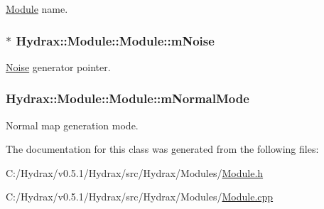 \hyperlink{class_hydrax_1_1_module_1_1_module}{Module} name. 

\hypertarget{class_hydrax_1_1_module_1_1_module_9403c14c89393c8c7f562a1946ca05ab}{
\subsubsection[{mNoise}]{$\ast$ {\bf Hydrax::Module::Module::mNoise}}}
\label{class_hydrax_1_1_module_1_1_module_9403c14c89393c8c7f562a1946ca05ab}


\hyperlink{namespace_hydrax_1_1_noise}{Noise} generator pointer. 

\hypertarget{class_hydrax_1_1_module_1_1_module_962d19d1a608a3935440a08544919f13}{
\subsubsection[{mNormalMode}]{ {\bf Hydrax::Module::Module::mNormalMode}}}
\label{class_hydrax_1_1_module_1_1_module_962d19d1a608a3935440a08544919f13}


Normal map generation mode. 



The documentation for this class was generated from the following files:\begin{CompactItemize}
\item 
C:/Hydrax/v0.5.1/Hydrax/src/Hydrax/Modules/\hyperlink{_module_8h}{Module.h}\item 
C:/Hydrax/v0.5.1/Hydrax/src/Hydrax/Modules/\hyperlink{_module_8cpp}{Module.cpp}\end{CompactItemize}
